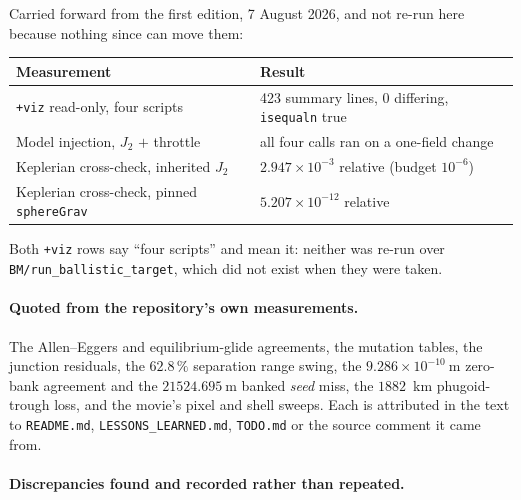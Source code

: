 \documentclass[11pt]{article}
\newcommand{\code}[1]{\texttt{#1}}
\newcommand{\pkg}[1]{\texttt{+#1}}
\begin{document}
Carried forward from the first edition, 7 August 2026, and not re-run here
because nothing since can move them:

\begin{center}
\begin{tabular}{ll}
\toprule
Measurement & Result \\
\midrule
\pkg{viz} read-only, four scripts         & 423 summary lines, 0 differing, \code{isequaln} true \\
Model injection, $J_2$ $+$ throttle       & all four calls ran on a one-field change \\
Keplerian cross-check, inherited $J_2$    & $2.947\times10^{-3}$ relative (budget $10^{-6}$) \\
Keplerian cross-check, pinned \code{sphereGrav} & $5.207\times10^{-12}$ relative \\
\bottomrule
\end{tabular}
\end{center}

Both \pkg{viz} rows say ``four scripts'' and mean it: neither was re-run over
\code{BM/run\_ballistic\_target}, which did not exist when they were taken.

\paragraph{Quoted from the repository's own measurements.} The Allen--Eggers
and equilibrium-glide agreements, the mutation tables, the junction residuals,
the $62.8\,\%$ separation range swing, the $9.286\times10^{-10}~\mathrm{m}$
zero-bank agreement and the $21524.695~\mathrm{m}$ banked \emph{seed} miss,
the $1882$~km
phugoid-trough loss, and the movie's pixel and shell sweeps. Each is attributed
in the text to \code{README.md}, \code{LESSONS\_LEARNED.md}, \code{TODO.md} or
the source comment it came from.

\paragraph{Discrepancies found and recorded rather than repeated.}
\end{document}
